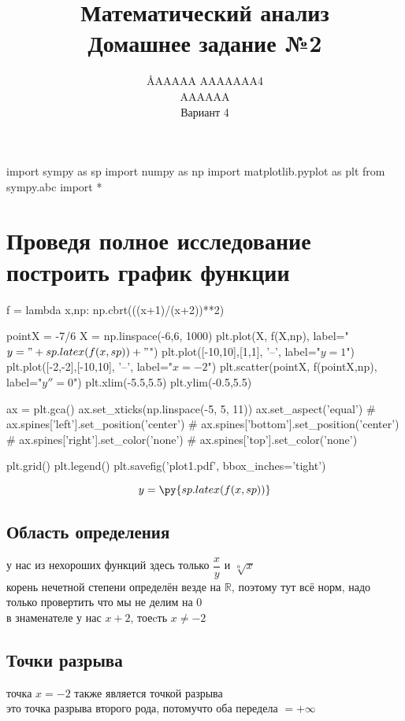 \documentclass{article}
\title{Математический анализ \\ Домашнее задание №2}
\author{\AA{AAAAA AAAAAAA}{4} \\ AAAAAA \\ Вариант 4}
\begin{document}
  \maketitle

  \begin{pycode}
    import sympy as sp
    import numpy as np
    import matplotlib.pyplot as plt
    from sympy.abc import *
  \end{pycode}

  \section{Проведя полное исследование построить график функции}
  \begin{pycode}
    f = lambda x,np: np.cbrt(((x+1)/(x+2))**2)

    pointX = -7/6
    X = np.linspace(-6,6, 1000)
    plt.plot(X, f(X,np), label="$y="+sp.latex(f(x,sp))+"$")
    plt.plot([-10,10],[1,1], '--', label="$y=1$")
    plt.plot([-2,-2],[-10,10], '--', label="$x=-2$")
    plt.scatter(pointX, f(pointX,np), label="$y''=0$")
    plt.xlim(-5.5,5.5)
    plt.ylim(-0.5,5.5)

    ax = plt.gca()
    ax.set_xticks(np.linspace(-5, 5, 11))
    ax.set_aspect('equal')
    # ax.spines['left'].set_position('center')
    # ax.spines['bottom'].set_position('center')
    # ax.spines['right'].set_color('none')
    # ax.spines['top'].set_color('none')

    plt.grid()
    plt.legend()
    plt.savefig('plot1.pdf', bbox_inches='tight')
  \end{pycode}
  \[ y = \py{sp.latex(f(x,sp))} \]

  \subsection{Область определения}
  у нас из нехороших функций здесь только $\dfrac{x}{y}$ и $\sqrt[n]{x}$ \\
  корень нечетной степени определён везде на $\mathbb{R}$, поэтому тут всё норм, надо только провертить что мы не делим на 0 \\
  в знаменателе у нас $x+2$, тоеcть $x\not=-2$ \\

  \subsection{Точки разрыва}
  точка $x=-2$ также является точкой разрыва \\
  это точка разрыва второго рода, потомучто оба передела $=+\infty$
\end{document}
